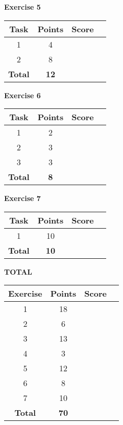 \documentclass [11pt, a4wide, twoside]{article}
\begin{document}
\noindent
\begin{minipage}[t]{120pt}

\vspace{1cm}

\textbf{Exercise 5}
\vspace{5pt}\\
\begin{tabular}{|c|c|c|c|}
\hline
Task & Points & Score \\\hline
1 & 4 & \\\hline
2 & 8 & \\\hline
\textbf{Total} & \textbf{12} &\\\hline\hline
\end{tabular}
\end{minipage}
\begin{minipage}[t]{120pt}
\vspace{1cm}

\textbf{Exercise 6}
\vspace{5pt}\\
\begin{tabular}{|c|c|c|c|}
\hline
Task & Points & Score \\\hline
1 & 2 & \\\hline
2 & 3 & \\\hline
3 & 3 & \\\hline
\textbf{Total} & \textbf{8} &\\\hline\hline
\end{tabular}
\end{minipage}
\begin{minipage}[t]{120pt}
\vspace{1cm}

\textbf{Exercise 7}
\vspace{5pt}\\
\begin{tabular}{|c|c|c|c|}
\hline
Task & Points & Score \\\hline
1 & 10 & \\\hline
\textbf{Total} & \textbf{10} &\\\hline\hline
\end{tabular}
\end{minipage}
\begin{minipage}[t]{120pt}
\vspace{1cm}

\textbf{TOTAL}
\vspace{5pt}\\
\begin{tabular}{|c|c|c|c|}
\hline
Exercise & Points & Score \\\hline
1 & 18 & \\\hline
2 & 6 & \\\hline
3 & 13 & \\\hline
4 & 3 & \\\hline
5 & 12 & \\\hline
6 & 8 & \\\hline
7 & 10 & \\\hline
\textbf{Total} & \textbf{70} &\\\hline\hline
\end{tabular}
\end{minipage}
\end{document}
